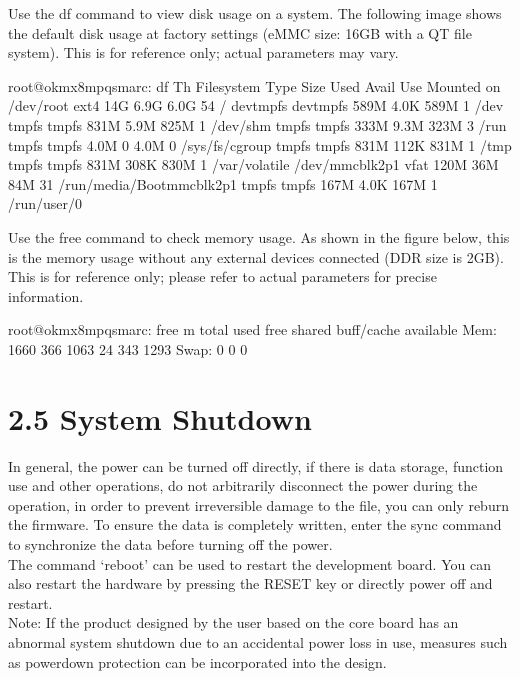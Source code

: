 \documentclass[letterpaper,10pt,openany,english]{sphinxmanual}
\begin{document}
\sphinxAtStartPar
Use the df command to view disk usage on a system. The following image shows the default disk usage at factory settings (eMMC size: 16GB with a QT file system). This is for reference only; actual parameters may vary.

\begin{sphinxVerbatim}[commandchars=\\\{\}]
root@ok\PYGZhy{}mx8mpq\PYGZhy{}smarc:\PYGZti{}\PYGZsh{} df \PYGZhy{}Th
Filesystem     Type      Size  Used Avail Use\PYGZpc{} Mounted on
/dev/root      ext4       14G  6.9G  6.0G  54\PYGZpc{} /
devtmpfs       devtmpfs  589M  4.0K  589M   1\PYGZpc{} /dev
tmpfs          tmpfs     831M  5.9M  825M   1\PYGZpc{} /dev/shm
tmpfs          tmpfs     333M  9.3M  323M   3\PYGZpc{} /run
tmpfs          tmpfs     4.0M     0  4.0M   0\PYGZpc{} /sys/fs/cgroup
tmpfs          tmpfs     831M  112K  831M   1\PYGZpc{} /tmp
tmpfs          tmpfs     831M  308K  830M   1\PYGZpc{} /var/volatile
/dev/mmcblk2p1 vfat      120M   36M   84M  31\PYGZpc{} /run/media/Boot\PYGZhy{}mmcblk2p1
tmpfs          tmpfs     167M  4.0K  167M   1\PYGZpc{} /run/user/0
\end{sphinxVerbatim}

\sphinxAtStartPar
Use the free command to check memory usage. As shown in the figure below, this is the memory usage without any external devices connected (DDR size is 2GB). This is for reference only; please refer to actual parameters for precise information.

\begin{sphinxVerbatim}[commandchars=\\\{\}]
root@ok\PYGZhy{}mx8mpq\PYGZhy{}smarc:\PYGZti{}\PYGZsh{} free \PYGZhy{}m
               total        used        free      shared  buff/cache   available
Mem:            1660         366        1063          24         343        1293
Swap:              0           0           0
\end{sphinxVerbatim}


\section{2.5 System Shutdown}
\label{\detokenize{linux-manual:system-shutdown}}
\sphinxAtStartPar
In general, the power can be turned off directly, if there is data storage, function use and other operations, do not arbitrarily disconnect the power during the operation, in order to prevent irreversible damage to the file, you can only re\sphinxhyphen{}burn the firmware. To ensure the data is completely written, enter the sync command to synchronize the data before turning off the power.\\
The command ‘reboot’ can be used to restart the development board. You can also restart the hardware by pressing the RESET key or directly power off and restart.\\
Note: If the product designed by the user based on the core board has an abnormal system shutdown due to an accidental power loss in use, measures such as power\sphinxhyphen{}down protection can be incorporated into the design.
\end{document}
